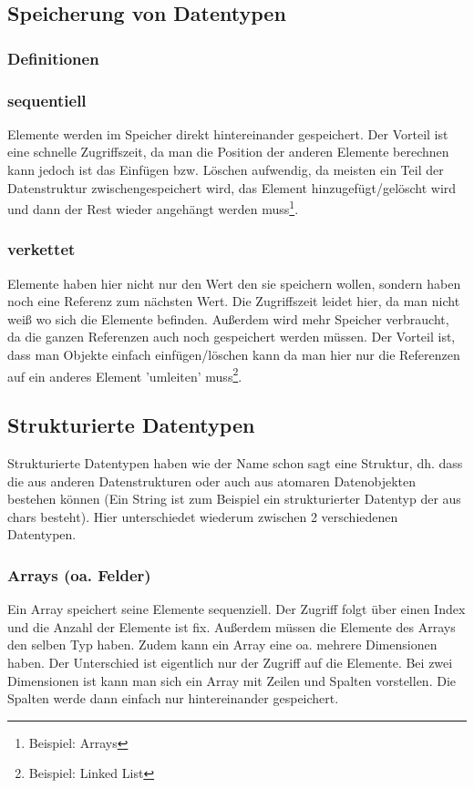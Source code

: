 \documentclass[a4paper]{scrartcl}
\begin{document}
        \subsection{Speicherung von Datentypen}
            \subsubsection{Definitionen}  
            \subsubsection*{sequentiell}
                Elemente werden im Speicher direkt hintereinander gespeichert. Der Vorteil ist eine schnelle Zugriffszeit, da man die Position der anderen Elemente berechnen kann jedoch ist das 
                Einfügen bzw. Löschen aufwendig, da meisten ein Teil der Datenstruktur zwischengespeichert wird, das Element hinzugefügt/gelöscht wird und dann der Rest wieder angehängt werden muss\footnote{Beispiel: Arrays}.
            \subsubsection*{verkettet}
                Elemente haben hier nicht nur den Wert den sie speichern wollen, sondern haben noch eine Referenz zum nächsten Wert. Die Zugriffszeit leidet hier, da man nicht weiß wo sich die Elemente befinden.
                Außerdem wird mehr Speicher verbraucht, da die ganzen Referenzen auch noch gespeichert werden müssen. Der Vorteil ist, dass man Objekte einfach einfügen/löschen kann da man hier nur die Referenzen
                auf ein anderes Element 'umleiten' muss\footnote{Beispiel: Linked List}.
        \subsection{Strukturierte Datentypen}
                Strukturierte Datentypen haben wie der Name schon sagt eine Struktur, dh. dass die aus anderen Datenstrukturen oder auch aus atomaren Datenobjekten bestehen können (Ein String ist zum Beispiel
                ein strukturierter Datentyp der aus chars besteht). Hier unterschiedet wiederum zwischen 2 verschiedenen Datentypen.
            \subsubsection*{Arrays (oa. Felder)}
                Ein Array speichert seine Elemente sequenziell. Der Zugriff folgt über einen Index und die Anzahl der Elemente ist fix. Außerdem müssen die Elemente des Arrays den selben Typ haben.
                Zudem kann ein Array eine oa. mehrere Dimensionen haben. Der Unterschied ist eigentlich nur der Zugriff auf die Elemente. Bei zwei Dimensionen ist kann man sich ein Array mit Zeilen und Spalten vorstellen.
                Die Spalten werde dann einfach nur hintereinander gespeichert.
\end{document}
